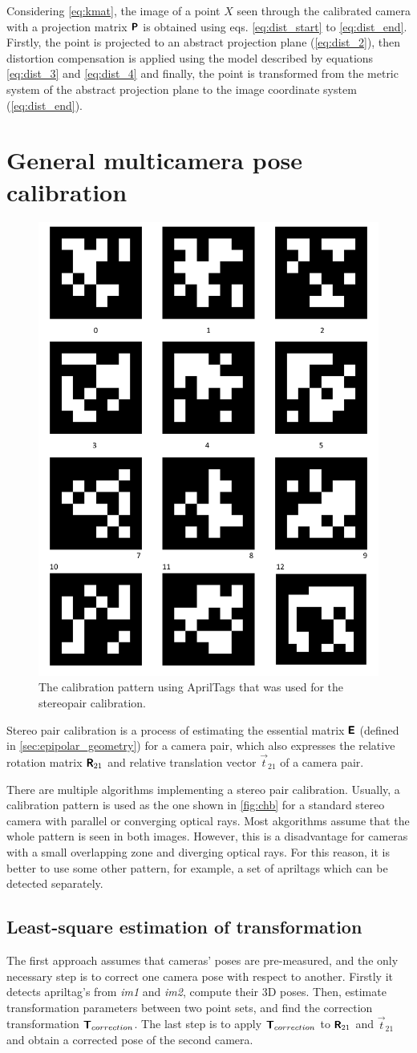 Considering \autoref{eq:kmat}, the image of a point $X$ seen through the calibrated camera with a projection matrix $\pmb{\mathsf{P}}$ is obtained using eqs. \eqref{eq:dist_start} to \eqref{eq:dist_end}. 
Firstly, the point is projected to an abstract projection plane (\autoref{eq:dist_2}), then distortion compensation is applied using the model described by equations \eqref{eq:dist_3} and \eqref{eq:dist_4} and finally, the point is transformed from the metric system of the abstract projection plane to the image coordinate system (\autoref{eq:dist_end}).

\section{General multicamera pose calibration}
\label{sec:stereocalib}

\begin{figure}[h]
    \centering
    \includegraphics[width=.2\textwidth]{graphics/aptags.png}
    \caption{The calibration pattern using AprilTags \cite{Wang2016} that was used for the stereopair calibration.}
    \label{fig:aptags}
\end{figure}

Stereo pair calibration is a process of estimating the essential matrix $\pmb{\mathsf{E}}$ (defined in \autoref{sec:epipolar_geometry}) for a camera pair, which also expresses the relative rotation matrix $\pmb{\mathsf{R}}_{21}$ and relative translation vector $\vec{t}_{21}$ of a camera pair. 

There are multiple algorithms implementing a stereo pair calibration.
Usually, a calibration pattern is used as the one shown in \autoref{fig:chb} for a standard stereo camera with parallel or converging optical rays.
Most akgorithms assume that the whole pattern is seen in both images.
However, this is a disadvantage for cameras with a small overlapping zone and diverging optical rays.
For this reason, it is better to use some other pattern, for example, a set of apriltags \cite{Malyuta2019} which can be detected separately. 

\subsection{Least-square estimation of transformation}
\label{sec:lsq_umeyama}
The first approach assumes that cameras' poses are pre-measured, and the only necessary step is to correct one camera pose with respect to another.
Firstly it detects apriltag's from \textit{im1} and \textit{im2}, compute their 3D poses.
Then, estimate transformation parameters between two point sets, and find the correction transformation $\pmb{\mathsf{T}}_{correction}$.
The last step is to apply $\pmb{\mathsf{T}}_{correction}$ to $\pmb{\mathsf{R}}_{21}$ and $\vec{t}_{21}$ and obtain a corrected pose of the second camera.

